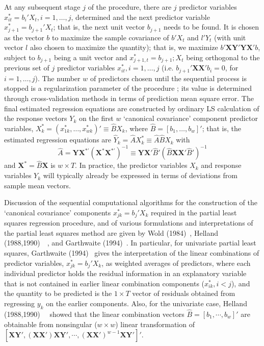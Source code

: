 At any subsequent stage $j$ of the procedure, there are $j$ predictor variables $x_{it}^*= b_i' X_t, i=1,\ldots, j$, determined and the next predictor variable $x_{j+1}^*= b_{j+1}'X_t$; that is, the next unit vector $b_{j+1}$ needs to be found. It is chosen as the vector $b$ to maximize the sample covariance of $b'X_t$ and $l' Y_t$ (with unit vector $l$ also chosen to maximize the quantity); that is, we maximize $b' \mathbf{XY'YX'}b$, subject to $b_{j+1}$ being a unit vector and $x_{j+1,t}^*=b_{j+1}; X_t$ being orthogonal to the previous set of $j$ predictor variables $x_{it}^*, i=1,\ldots,j$ (i.e. $b_{j+1}' \mathbf{XX'} b_i=0$, for $i=1,\ldots,j$). The number $w$ of predictors chosen until the sequential process is stopped is a regularization parameter of the procedure ; its value is determined through cross-validation methods in terms of prediction mean square error. The final estimated regression equations are constructed by ordinary LS calculation of the response vectors $Y_k$ on the first $w$ `canonical covariance' component predictor variables, $X_k^*=(x_{1k}^*,\ldots,x_{wk}^*)' \equiv \hat{B} X_k$, where $\hat{B}=[b_1,\ldots,b_w]'$; that is, the estimated regression equations are $\hat{Y}_k= \hat{A}X_k^* \equiv \hat{A}\hat{B} X_k$ with
	\[
	\hat{A}=\mathbf{YX}^{*'} (\mathbf{X}^* \mathbf{X}^{*'})^{-1} \equiv \mathbf{YX'} \hat{B}' (\hat{B} \mathbf{XX'} \hat{B}')^{-1}
	\]
and $\mathbf{X}^*=\hat{B}\mathbf{X}$ is $w \times T$. In practice, the predictor variables $X_k$ and response variables $Y_k$ will typically already be expressed in terms of deviations from sample mean vectors.


Discussion of the sequential computational algorithms for the construction of the `canonical covariance' components $x_{jk}^*=b_j'X_k$ required in the partial least squares regression procedure, and of various formulations and interpretations of the partial least squares method are given by Wold (1984)~\cite{wold}, Helland (1988,1990)~\cite{helland88}~\cite{helland90}, and Garthwaite (1994)~\cite{garth}. In particular, for univariate partial least squares, Garthwaite (1994)~\cite{garth} gives the interpretation of the linear combinations of predictor variables, $x_{jk}^*=b_j'X_k$, as weighted averages of predictors, where each individual predictor holds the residual information in an explanatory variable that is not contained in earlier linear combination components ($x_{ik}^*, i<j$), and the quantity to be predicted is the $1 \times T$ vector of residuals obtained from regressing $y_k$ on the earlier components. Also, for the univariate case, Helland (1988,1990)~\cite{helland88}~\cite{helland90} showed that the linear combination vectors $\hat{B}=[b_1,\cdots,b_w]'$ are obtainable from nonsingular ($w \times w$) linear transformation of $[\mathbf{XY'}, (\mathbf{XX'})\mathbf{XY'},\cdots,(\mathbf{XX'})^{w-1} \mathbf{XY'}]'$. 


